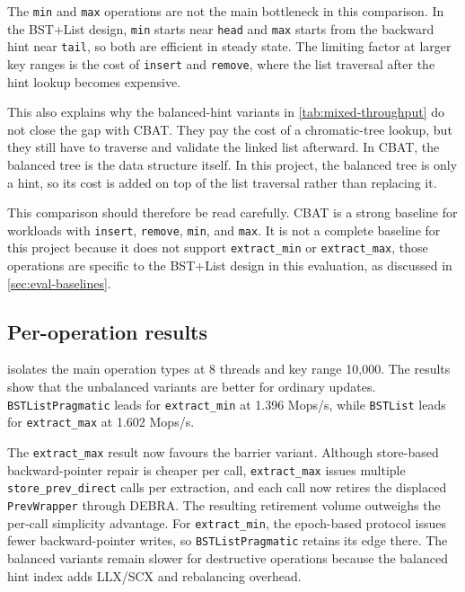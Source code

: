 \documentclass[a4paper,11pt]{article}
\newcommand{\code}[1]{\texttt{#1}}
\begin{document}
The \code{min} and \code{max} operations are not the main bottleneck in this comparison. In the BST+List design, \code{min} starts near \code{head} and \code{max} starts from the backward hint near \code{tail}, so both are efficient in steady state. The limiting factor at larger key ranges is the cost of \code{insert} and \code{remove}, where the list traversal after the hint lookup becomes expensive.

This also explains why the balanced-hint variants in \cref{tab:mixed-throughput} do not close the gap with CBAT. They pay the cost of a chromatic-tree lookup, but they still have to traverse and validate the linked list afterward. In CBAT, the balanced tree is the data structure itself. In this project, the balanced tree is only a hint, so its cost is added on top of the list traversal rather than replacing it.

This comparison should therefore be read carefully. CBAT is a strong baseline for workloads with \code{insert}, \code{remove}, \code{min}, and \code{max}. It is not a complete baseline for this project because it does not support \code{extract\_min} or \code{extract\_max}, those operations are specific to the BST+List design in this evaluation, as discussed in \cref{sec:eval-baselines}.

\subsection{Per-operation results}

 isolates the main operation types at 8 threads and key range 10,000. The results show that the unbalanced variants are better for ordinary updates. \code{BSTListPragmatic} leads for \code{extract\_min} at 1.396 Mops/s, while \code{BSTList} leads for \code{extract\_max} at 1.602 Mops/s.

The \code{extract\_max} result now favours the barrier variant. Although store-based backward-pointer repair is cheaper per call, \code{extract\_max} issues multiple \code{store\_prev\_direct} calls per extraction, and each call now retires the displaced \code{PrevWrapper} through DEBRA. The resulting retirement volume outweighs the per-call simplicity advantage. For \code{extract\_min}, the epoch-based protocol issues fewer backward-pointer writes, so \code{BSTListPragmatic} retains its edge there. The balanced variants remain slower for destructive operations because the balanced hint index adds LLX/SCX and rebalancing overhead.
\end{document}
